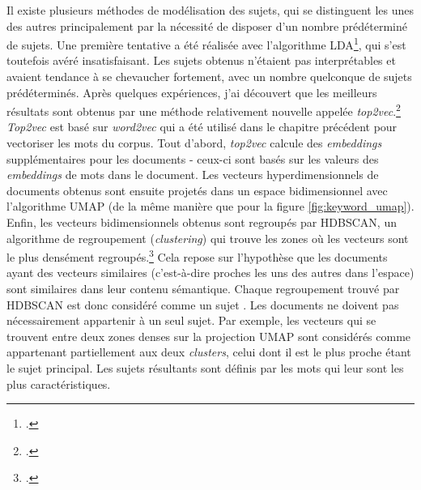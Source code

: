 \documentclass[a4paper,twoside,12pt]{article}
\begin{document}
Il existe plusieurs méthodes de modélisation des sujets, qui se distinguent les unes des autres principalement par la nécessité de disposer d'un nombre prédéterminé de sujets. Une première tentative a été réalisée avec l'algorithme LDA\footcite{jelodar_latent_2019}, qui s'est toutefois avéré insatisfaisant. Les sujets obtenus n'étaient pas interprétables et avaient tendance à se chevaucher fortement, avec un nombre quelconque de sujets prédéterminés. Après quelques expériences, j'ai découvert que les meilleurs résultats sont obtenus par une méthode relativement nouvelle appelée \textit{top2vec}.\footcite{angelov_top2vec_2020} \textit{Top2vec} est basé sur \textit{word2vec} qui a été utilisé dans le chapitre précédent pour vectoriser les mots du corpus. Tout d'abord, \textit{top2vec} calcule des \textit{embeddings} supplémentaires pour les documents - ceux-ci sont basés sur les valeurs des \textit{embeddings} de mots dans le document. Les vecteurs hyperdimensionnels de documents obtenus sont ensuite projetés dans un espace bidimensionnel avec l'algorithme UMAP (de la même manière que pour la figure \ref{fig:keyword_umap}). Enfin, les vecteurs bidimensionnels obtenus sont regroupés par HDBSCAN, un algorithme de regroupement (\textit{clustering}) qui trouve les zones où les vecteurs sont le plus densément regroupés.\footcites{campello_density-based_2013} Cela repose sur l'hypothèse que les documents ayant des vecteurs similaires (c'est-à-dire proches les uns des autres dans l'espace) sont similaires dans leur contenu sémantique. Chaque regroupement trouvé par HDBSCAN est donc considéré comme un \og sujet \fg{}. Les documents ne doivent pas nécessairement appartenir à un seul sujet. Par exemple, les vecteurs qui se trouvent entre deux zones denses sur la projection UMAP sont considérés comme appartenant partiellement aux deux \textit{clusters}, celui dont il est le plus proche étant le sujet principal. Les sujets résultants sont définis par les mots qui leur sont les plus caractéristiques.
\end{document}
